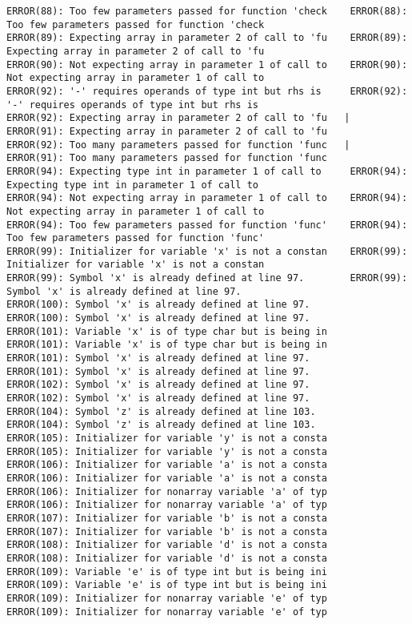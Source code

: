 \documentclass[12pt]{book}
\begin{document}
\begin{lstlisting}
ERROR(88): Too few parameters passed for function 'check	ERROR(88): Too few parameters passed for function 'check
ERROR(89): Expecting array in parameter 2 of call to 'fu	ERROR(89): Expecting array in parameter 2 of call to 'fu
ERROR(90): Not expecting array in parameter 1 of call to	ERROR(90): Not expecting array in parameter 1 of call to
ERROR(92): '-' requires operands of type int but rhs is 	ERROR(92): '-' requires operands of type int but rhs is 
ERROR(92): Expecting array in parameter 2 of call to 'fu   |	ERROR(91): Expecting array in parameter 2 of call to 'fu
ERROR(92): Too many parameters passed for function 'func   |	ERROR(91): Too many parameters passed for function 'func
ERROR(94): Expecting type int in parameter 1 of call to 	ERROR(94): Expecting type int in parameter 1 of call to 
ERROR(94): Not expecting array in parameter 1 of call to	ERROR(94): Not expecting array in parameter 1 of call to
ERROR(94): Too few parameters passed for function 'func'	ERROR(94): Too few parameters passed for function 'func'
ERROR(99): Initializer for variable 'x' is not a constan	ERROR(99): Initializer for variable 'x' is not a constan
ERROR(99): Symbol 'x' is already defined at line 97.		ERROR(99): Symbol 'x' is already defined at line 97.
ERROR(100): Symbol 'x' is already defined at line 97.		ERROR(100): Symbol 'x' is already defined at line 97.
ERROR(101): Variable 'x' is of type char but is being in	ERROR(101): Variable 'x' is of type char but is being in
ERROR(101): Symbol 'x' is already defined at line 97.		ERROR(101): Symbol 'x' is already defined at line 97.
ERROR(102): Symbol 'x' is already defined at line 97.		ERROR(102): Symbol 'x' is already defined at line 97.
ERROR(104): Symbol 'z' is already defined at line 103.		ERROR(104): Symbol 'z' is already defined at line 103.
ERROR(105): Initializer for variable 'y' is not a consta	ERROR(105): Initializer for variable 'y' is not a consta
ERROR(106): Initializer for variable 'a' is not a consta	ERROR(106): Initializer for variable 'a' is not a consta
ERROR(106): Initializer for nonarray variable 'a' of typ	ERROR(106): Initializer for nonarray variable 'a' of typ
ERROR(107): Initializer for variable 'b' is not a consta	ERROR(107): Initializer for variable 'b' is not a consta
ERROR(108): Initializer for variable 'd' is not a consta	ERROR(108): Initializer for variable 'd' is not a consta
ERROR(109): Variable 'e' is of type int but is being ini	ERROR(109): Variable 'e' is of type int but is being ini
ERROR(109): Initializer for nonarray variable 'e' of typ	ERROR(109): Initializer for nonarray variable 'e' of typ

\end{lstlisting}
\end{document}
